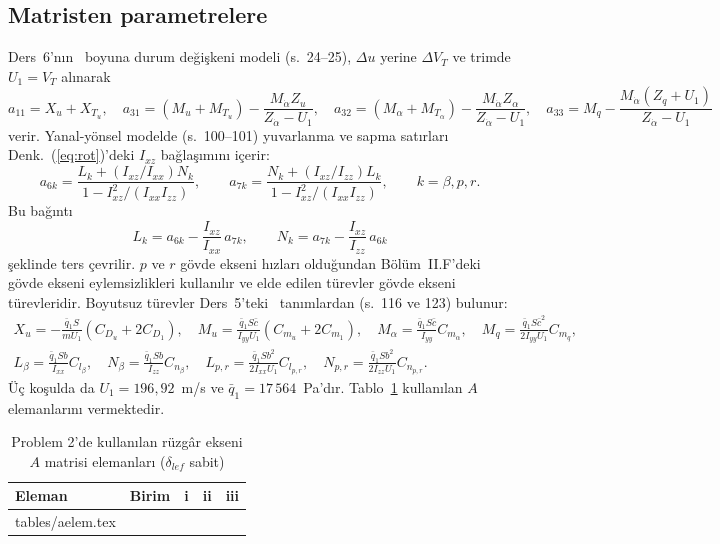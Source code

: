 \documentclass[conf]{new-aiaa}
\makeatletter
\newcommand\tabinput[1]{\@@input #1 }
\makeatother
\begin{document}
\subsection{Matristen parametrelere}
Ders~6'nın~\cite{lec6} boyuna durum değişkeni modeli (s.~24--25), $\Delta u$ yerine $\Delta V_T$ ve trimde $U_1=V_T$ alınarak
\begin{equation}
a_{11}=X_u+X_{T_u},\quad
a_{31}=(M_u+M_{T_u})-\frac{M_{\dot\alpha}Z_u}{Z_{\dot\alpha}-U_1},\quad
a_{32}=(M_\alpha+M_{T_\alpha})-\frac{M_{\dot\alpha}Z_\alpha}{Z_{\dot\alpha}-U_1},\quad
a_{33}=M_q-\frac{M_{\dot\alpha}(Z_q+U_1)}{Z_{\dot\alpha}-U_1}
\end{equation}
verir. Yanal-yönsel modelde (s.~100--101) yuvarlanma ve sapma satırları Denk.~(\ref{eq:rot})'deki $I_{xz}$ bağlaşımını içerir:
\begin{equation}
a_{6k}=\frac{L_k+(I_{xz}/I_{xx})N_k}{1-I_{xz}^2/(I_{xx}I_{zz})},\qquad
a_{7k}=\frac{N_k+(I_{xz}/I_{zz})L_k}{1-I_{xz}^2/(I_{xx}I_{zz})},\qquad k=\beta,p,r.
\end{equation}
Bu bağıntı
\begin{equation}
L_k=a_{6k}-\frac{I_{xz}}{I_{xx}}\,a_{7k},\qquad N_k=a_{7k}-\frac{I_{xz}}{I_{zz}}\,a_{6k}
\label{eq:invert}
\end{equation}
şeklinde ters çevrilir. $p$ ve $r$ gövde ekseni hızları olduğundan Bölüm~II.F'deki gövde ekseni eylemsizlikleri kullanılır ve elde edilen türevler gövde ekseni türevleridir. Boyutsuz türevler Ders~5'teki~\cite{lec5} tanımlardan (s.~116 ve 123) bulunur:
\begin{gather}
X_u=-\frac{\bar q_1S}{mU_1}(C_{D_u}+2C_{D_1}),\quad
M_u=\frac{\bar q_1S\bar c}{I_{yy}U_1}(C_{m_u}+2C_{m_1}),\quad
M_\alpha=\frac{\bar q_1S\bar c}{I_{yy}}C_{m_\alpha},\quad
M_q=\frac{\bar q_1S\bar c^2}{2I_{yy}U_1}C_{m_q},\\
L_\beta=\frac{\bar q_1Sb}{I_{xx}}C_{l_\beta},\quad
N_\beta=\frac{\bar q_1Sb}{I_{zz}}C_{n_\beta},\quad
L_{p,r}=\frac{\bar q_1Sb^2}{2I_{xx}U_1}C_{l_{p,r}},\quad
N_{p,r}=\frac{\bar q_1Sb^2}{2I_{zz}U_1}C_{n_{p,r}}.
\end{gather}
Üç koşulda da $U_1=196,92$~m/s ve $\bar q_1=17\,564$~Pa'dır. Tablo~\ref{tab:aelem} kullanılan $A$ elemanlarını vermektedir.

\begin{table}[hbt!]
\caption{\label{tab:aelem} Problem 2'de kullanılan rüzgâr ekseni $A$ matrisi elemanları ($\delta_{lef}$ sabit)}
\centering
\begin{tabular}{llccc}
\toprule
Eleman & Birim & i & ii & iii \\
\midrule
\tabinput{tables/aelem.tex}
\bottomrule
\end{tabular}
\end{table}
\end{document}
